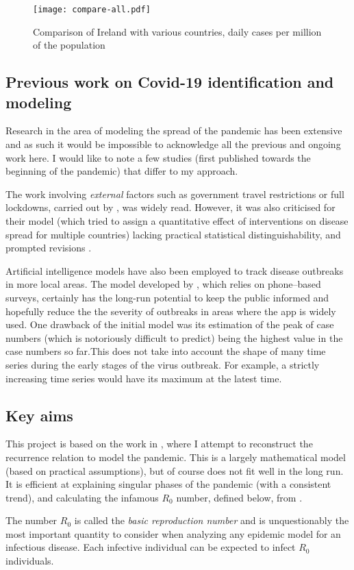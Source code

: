 \begin{figure}[H]
\texttt{[image: compare-all.pdf]}
\endminipage
\caption{Comparison of Ireland with various countries, daily cases per million of the population}
\end{figure}




\subsection{Previous work on Covid-19 identification and modeling}
Research in the area of modeling the spread of the pandemic has been extensive and as such it would be impossible to acknowledge all the previous and ongoing work here. I would like to note a few studies (first published towards the beginning of the pandemic) that differ to my approach.

The work involving \textit{external} factors such as government travel restrictions or full lockdowns, carried out by \cite{flaxman20}, was widely read. However, it was also criticised for their model (which tried to assign a quantitative effect of interventions on disease spread for multiple countries) lacking practical statistical distinguishability, and prompted revisions \cite{flaxman20reply}.

Artificial intelligence models have also been employed to track disease outbreaks in more local areas. The model developed by \cite{SrinivasaRao2020}, which relies on phone–based surveys, certainly has the long-run potential to keep the public informed and hopefully reduce the the severity of outbreaks in areas where the app is widely used. One drawback of the initial model was its estimation of the peak of case numbers (which is notoriously difficult to predict) being the highest value in the case numbers so far.This does not take into account the shape of many time series during the early stages of the virus outbreak. For example, a strictly increasing time series would have its maximum at the latest time.


\subsection{Key aims}

This project is based on the work in \cite{grigor20}, where I attempt to reconstruct the recurrence relation to model the pandemic. This is a largely mathematical model (based on practical assumptions), but of course does not fit well in the long run. It is efficient at explaining singular phases of the pandemic (with a consistent trend), and calculating the infamous $R_0$ number, defined below, from \cite{epid08}. 

\begin{ndefinition} 
The number $R_0$ is called
the \textit{basic reproduction number} and is unquestionably the most important quantity to consider when analyzing any epidemic model for an infectious disease. Each infective individual can be expected to infect $R_0$ individuals. 
\end{ndefinition}

